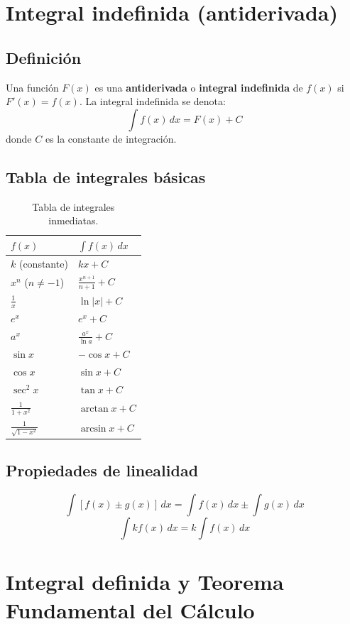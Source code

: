 \documentclass[12pt,a4paper,openany,oneside]{book}
\begin{document}
\section{Integral indefinida (antiderivada)}

\subsection{Definición}
Una función $F(x)$ es una \textbf{antiderivada} o \textbf{integral indefinida} de $f(x)$ si $F'(x) = f(x)$. La integral indefinida se denota:
\[
\int f(x) \, dx = F(x) + C
\]
donde $C$ es la constante de integración.

\subsection{Tabla de integrales básicas}
\begin{table}[h]
\centering
\begin{tabular}{ll}
\toprule
$f(x)$ & $\int f(x)\, dx$ \\ \midrule
$k$ (constante) & $kx + C$ \\
$x^n$ ($n \neq -1$) & $\frac{x^{n+1}}{n+1} + C$ \\
$\frac{1}{x}$ & $\ln|x| + C$ \\
$e^x$ & $e^x + C$ \\
$a^x$ & $\frac{a^x}{\ln a} + C$ \\
$\sin x$ & $-\cos x + C$ \\
$\cos x$ & $\sin x + C$ \\
$\sec^2 x$ & $\tan x + C$ \\
$\frac{1}{1+x^2}$ & $\arctan x + C$ \\
$\frac{1}{\sqrt{1-x^2}}$ & $\arcsin x + C$ \\
\bottomrule
\end{tabular}
\caption{Tabla de integrales inmediatas.}
\end{table}

\subsection{Propiedades de linealidad}
\[
\int [f(x) \pm g(x)] \, dx = \int f(x) \, dx \pm \int g(x) \, dx
\]
\[
\int k f(x) \, dx = k \int f(x) \, dx
\]

\section{Integral definida y Teorema Fundamental del Cálculo}
\end{document}
